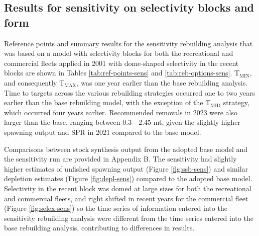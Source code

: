 \documentclass[11pt,
  english,
  a4paper,
]{article}
\begin{document}

\hypertarget{results-for-sensitivity-on-selectivity-blocks-and-form}{%
\subsection{Results for sensitivity on selectivity blocks and form}\label{results-for-sensitivity-on-selectivity-blocks-and-form}}

\leavevmode\tagmcend\tagstructend


Reference points and summary results for the sensitivity rebuilding analysis that was based on a model with selectivity blocks for both the recreational and commercial fleets applied in 2001 with dome-shaped selectivity in the recent blocks are shown in Tables \ref{tab:ref-points-sens} and \ref{tab:reb-options-sens}. {\(\text{T}_\text{MIN}\)\leavevmode\tagmcend\tagstructend}, and consequently {\(\text{T}_\text{MAX}\)\leavevmode\tagmcend\tagstructend}, was one year earlier than the base rebuilding analysis. Time to targets across the various rebuilding strategies occurred one to two years earlier than the base rebuilding model, with the exception of the {\(\text{T}_\text{MID}\)\leavevmode\tagmcend\tagstructend} strategy, which occurred four years earlier. Recommended removals in 2023 were also larger than the base, ranging between 0.3 - 2.45 mt, given the slightly higher spawning output and SPR in 2021 compared to the base model.

\leavevmode\tagmcend\tagstructend\par


Comparisons between stock synthesis output from the adopted base model and the sensitivity run are provided in \protect\hypertarget{append_b}{}{Appendix B}. The sensitivity had slightly higher estimates of unfished spawning output (Figure \ref{fig:ssb-sens}) and similar depletion estimates (Figure \ref{fig:depl-sens}) compared to the adopted base model. Selectivity in the recent block was domed at large sizes for both the recreational and commercial fleets, and right shifted in recent years for the commercial fleet (Figure \ref{fig:selex-sens}) so the time series of information entered into the sensitivity rebuilding analysis were different from the time series entered into the base rebuilding analysis, contributing to differences in results.
\end{document}
